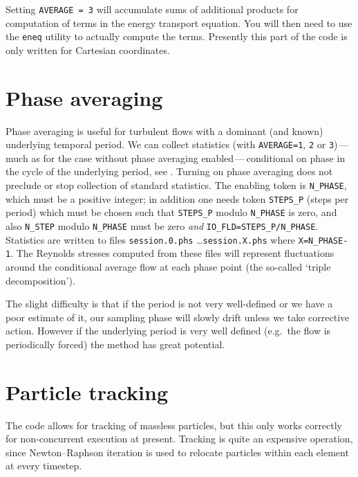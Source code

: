 \documentclass[11pt]{report}
\newcommand{\eg}{e.g.\ } \newcommand{\CC}{\mathrm{c.c.}}
\begin{document}
Setting \verb+AVERAGE = 3+ will accumulate sums of additional products
for computation of terms in the energy transport equation. You will
then need to use the \verb+eneq+ utility to actually compute the
terms. Presently this part of the code is only written for Cartesian
coordinates.

\section{Phase averaging}
\label{sec.phase}

Phase averaging is useful for turbulent flows with a dominant (and
known) underlying temporal period.  We can collect statistics (with
\verb|AVERAGE=1|, \verb|2| or \verb|3|)\,---\,much as for the case
without phase averaging enabled\,---\,conditional on phase in the
cycle of the underlying period, see \citet{rehu72}.  Turning
on phase averaging does not preclude or stop collection of standard
statistics.  The enabling token is \verb|N_PHASE|, which must be a
positive integer; in addition one needs token \verb|STEPS_P| (steps
per period) which must be chosen such that \verb|STEPS_P| modulo
\verb|N_PHASE| is zero, and also \verb|N_STEP| modulo \verb|N_PHASE|
must be zero \emph{and} \verb|IO_FLD=STEPS_P/N_PHASE|.  Statistics are
written to files \verb|session.0.phs| \ldots \verb|session.X.phs|
where \verb|X=N_PHASE-1|.  The Reynolds stresses computed from these
files will represent fluctuations around the conditional average flow
at each phase point (the so-called `triple decomposition').

The slight difficulty is that if the period is not very well-defined
or we have a poor estimate of it, our sampling phase will slowly drift
unless we take corrective action.  However if the underlying period is
very well defined (\eg the flow is periodically forced) the method has
great potential.

\section{Particle tracking}
\label{sec.particle}

The code allows for tracking of massless particles, but this only
works correctly for non-concurrent execution at present.  Tracking is
quite an expensive operation, since Newton--Raphson iteration is used
to relocate particles within each element at every timestep.
\end{document}
